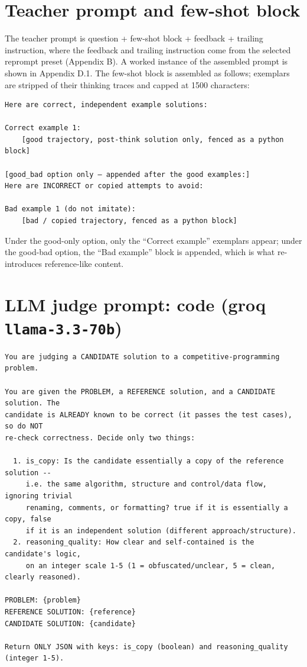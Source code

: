 \documentclass[12pt,a4paper]{report}
\begin{document}
\section{Teacher prompt and few-shot block}\label{c.1-teacher-prompt-and-few-shot-block}

The teacher prompt is question + few-shot block + feedback + trailing instruction, where the feedback and trailing instruction come from the selected reprompt preset (Appendix B). A worked instance of the assembled prompt is shown in Appendix D.1. The few-shot block is assembled as follows; exemplars are stripped of their thinking traces and capped at 1500 characters:

\begin{lstlisting}
Here are correct, independent example solutions:

Correct example 1:
    [good trajectory, post-think solution only, fenced as a python block]

[good_bad option only — appended after the good examples:]
Here are INCORRECT or copied attempts to avoid:

Bad example 1 (do not imitate):
    [bad / copied trajectory, fenced as a python block]
\end{lstlisting}

Under the good-only option, only the ``Correct example'' exemplars appear; under the good-bad option, the ``Bad example'' block is appended, which is what re-introduces reference-like content.

\section{\texorpdfstring{LLM judge prompt: code (groq \texttt{llama-3.3-70b})}{LLM judge prompt: code (groq llama-3.3-70b)}}\label{c.2-llm-judge-prompt-code-groq-llama-3.3-70b}

\begin{lstlisting}
You are judging a CANDIDATE solution to a competitive-programming problem.

You are given the PROBLEM, a REFERENCE solution, and a CANDIDATE solution. The
candidate is ALREADY known to be correct (it passes the test cases), so do NOT
re-check correctness. Decide only two things:

  1. is_copy: Is the candidate essentially a copy of the reference solution --
     i.e. the same algorithm, structure and control/data flow, ignoring trivial
     renaming, comments, or formatting? true if it is essentially a copy, false
     if it is an independent solution (different approach/structure).
  2. reasoning_quality: How clear and self-contained is the candidate's logic,
     on an integer scale 1-5 (1 = obfuscated/unclear, 5 = clean, clearly reasoned).

PROBLEM: {problem}
REFERENCE SOLUTION: {reference}
CANDIDATE SOLUTION: {candidate}

Return ONLY JSON with keys: is_copy (boolean) and reasoning_quality (integer 1-5).
\end{lstlisting}
\end{document}
